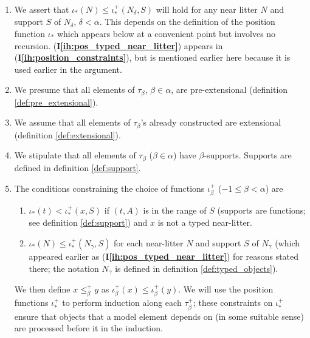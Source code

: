 \documentclass{article}
\theoremstyle{definition}
\theoremstyle{remark}
\newcommand{\ihref}[1]{(\textbf{I\ref{#1}})}
\begin{document}
\begin{enumerate}
\item \label{ih:pos_typed_near_litter} We assert that $\iota_*(N) \leq \iota_*^+(N_\delta,S)$ will hold for any near litter $N$ and support $S$ of $N_\delta$, $\delta<\alpha$.  This depends on the definition
of the position function $\iota_*$ which appears below at a convenient point but involves no recursion.  \ihref{ih:pos_typed_near_litter} appears in \ihref{ih:position_constraints}, but is mentioned earlier here because it is used earlier in the argument.

\item \label{ih:pre_extensional} We presume that all elements of $\tau_\beta$, $\beta\in \alpha$, are pre-extensional {(definition \ref{def:pre_extensional})}.

\item \label{ih:extensional} We assume that all elements of $\tau_\beta$'s already constructed are extensional {(definition \ref{def:extensional})}.

\item \label{ih:elements_have_supports} We stipulate that all elements of $\tau_\beta$ ($\beta\in\alpha$) have $\beta$-supports.  {Supports are defined in definition \ref{def:support}.}

\item \label{ih:position_constraints} The conditions constraining the choice of functions $\iota^+_\beta$ ($-1 \leq \beta < \alpha$) are

\begin{enumerate}

\item $\iota_*(t) < \iota^+_*(x,S)$ if $(t,A)$ is in the range of $S$ {(supports are functions; see definition \ref{def:support})} and $x$ is not a typed near-litter.

\item $\iota_*(N) \leq \iota^+_*(N_\gamma,S)$ for each near-litter $N$ and support $S$ of $N_\gamma
$ {(which appeared earlier as \ihref{ih:pos_typed_near_litter} for reasons stated there; the notation $N_\gamma$ is defined in definition \ref{def:typed_objects}).}

\end{enumerate}

We then define $x \leq^+_\beta y$ as $\iota^+_\beta(x) \leq \iota^+_\beta(y)$.  {We will use the position functions $\iota^+_*$ to perform induction along each $\tau_\beta^+$; these constraints on $\iota^+_*$ ensure that objects that a model element depends on (in some suitable sense) are processed before it in the induction.}

\end{enumerate}
\end{document}

